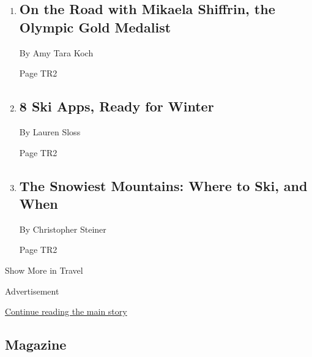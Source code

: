 \begin{enumerate}
\def\labelenumi{\arabic{enumi}.}
\item
  \href{/2019/11/30/travel/mikaela-shiffrin.html}{}

  \hypertarget{on-the-road-with-mikaela-shiffrin-the-olympic-gold-medalist}{%
  \subsection{On the Road with Mikaela Shiffrin, the Olympic Gold
  Medalist}\label{on-the-road-with-mikaela-shiffrin-the-olympic-gold-medalist}}

  By Amy Tara Koch

  Page TR2
\item
  \href{/2019/11/26/travel/best-ski-apps.html}{}

  \hypertarget{8-ski-apps-ready-for-winter}{%
  \subsection{8 Ski Apps, Ready for
  Winter}\label{8-ski-apps-ready-for-winter}}

  By Lauren Sloss

  Page TR2
\item
  \href{/2019/11/27/travel/best-snow-skiing.html}{}

  \hypertarget{the-snowiest-mountains-where-to-ski-and-when}{%
  \subsection{The Snowiest Mountains: Where to Ski, and
  When}\label{the-snowiest-mountains-where-to-ski-and-when}}

  By Christopher Steiner

  Page TR2
\end{enumerate}

Show More in Travel

Advertisement

\protect\hyperlink{after-mid5}{Continue reading the main story}

\hypertarget{magazine}{%
\subsection{Magazine}\label{magazine}}

